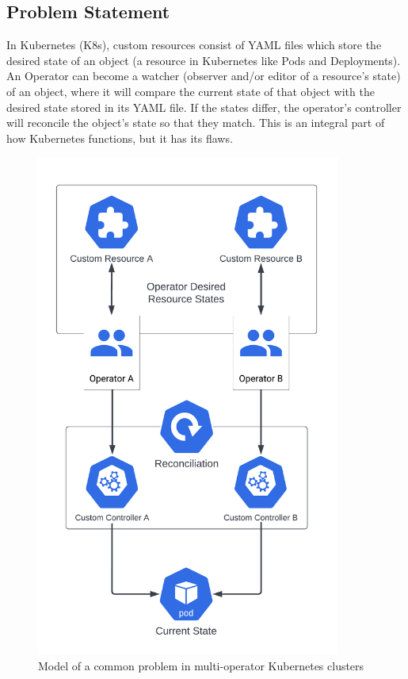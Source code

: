 \documentclass{article}
\begin{document}

\subsection{Problem Statement}
In Kubernetes (K8s), custom resources consist of YAML files which store the desired state of an object (a resource in Kubernetes like Pods and Deployments). 
An Operator can become a watcher (observer and/or editor of a resource’s state) of an object, where it will compare the current state of that object with the desired state stored in its YAML file. 
If the states differ, the operator’s controller will reconcile the object’s state so that they match. This is an integral part of how Kubernetes functions, but it has its flaws. 

\begin{figure}[!hb]
    \centering
    \includegraphics[width=100mm]{./resources/problem-model.png}
    \caption{Model of a common problem in multi-operator Kubernetes clusters}
    \label{problem-model}
\end{figure}
\end{document}
